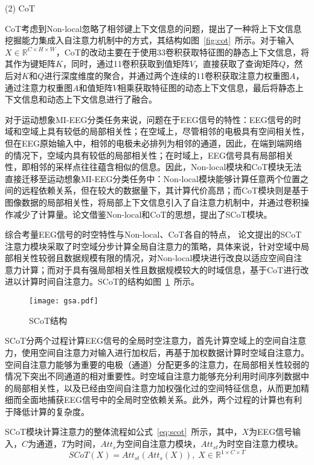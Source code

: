 (2) CoT

CoT考虑到Non-local忽略了相邻键上下文信息的问题，提出了一种将上下文信息挖掘能力集成入自注意力机制中的方式，其结构如图~\ref{fig:cot}~所示。对于输入\(X \in \mathbb{R}^{C \times H \times W}\)，CoT的改动主要在于使用3\times3卷积获取特征图的静态上下文信息，将其作为键矩阵\(K\)，同时，通过1\times1卷积获取到值矩阵\(V\)，直接获取了查询矩阵\(Q\)，然后对\(K\)和\(Q\)进行深度维度的聚合，并通过两个连续的1\times1卷积获取注意力权重图\(A\)，通过注意力权重图\(A\)和值矩阵\(V\)相乘获取特征图的动态上下文信息，最后将静态上下文信息和动态上下文信息进行了融合。

对于运动想象MI-EEG分类任务来说，问题在于EEG信号的特性：EEG信号的时域和空域上具有较低的局部相关性；在空域上，尽管相邻的电极具有空间相关性，但在EEG原始输入中，相邻的电极未必排列为相邻的通道，因此，在端到端网络的情况下，空域内具有较低的局部相关性；在时域上，EEG信号具有局部相关性，即相邻的采样点往往蕴含相似的信息。因此，Non-local模块和CoT模块无法直接迁移至运动想象MI-EEG分类任务中：Non-local模块能够计算任意两个位置之间的远程依赖关系，但在较大的数据量下，其计算代价高昂；而CoT模块则是基于图像数据的局部相关性，将局部上下文信息引入了自注意力机制中，并通过卷积操作减少了计算量。论文借鉴Non-local和CoT的思想，提出了SCoT模块。

综合考量EEG信号的时空特性与Non-local、CoT各自的特点，
论文提出的SCoT注意力模块采取了时空域分步计算全局自注意力的策略，具体来说，针对空域中局部相关性较弱且数据规模有限的情况，对Non-local模块进行改良以适应空间自注意力计算；而对于具有强局部相关性且数据规模较大的时域信息，基于CoT进行改进以计算时间自注意力。SCoT的结构如图~\ref{fig:gsa}~所示。
\begin{figure}
    \centering
    \texttt{[image: gsa.pdf]}
    \caption{SCoT结构}
    \label{fig:gsa}
\end{figure}

SCoT分两个过程计算EEG信号的全局时空注意力，首先计算空域上的空间自注意力，使用空间自注意力对输入进行加权后，再基于加权数据计算时空域自注意力。空间自注意力能够为重要的电极（通道）分配更多的注意力，在局部相关性较弱的情况下突出不同通道的相对重要性。时空域自注意力能够充分利用时间序列数据中的局部相关性，以及已经由空间自注意力加权强化过的空间特征信息，从而更加精细而全面地捕获EEG信号中的全局时空依赖关系。此外，两个过程的计算也有利于降低计算的复杂度。

SCoT模块计算注意力的整体流程如公式~\ref{eq:scot}~所示，其中，\(X\)为EEG信号输入，\(C\)为通道，\(T\)为时间，\(Att_s\)为空间自注意力模块，\(Att_{st}\)为时空自注意力模块。
\begin{equation}
    SCoT(X)=Att_{st}(Att_s(X)), \; X \in \mathbb{R}^{1 \times C \times T}
    \label{eq:scot}
\end{equation}

